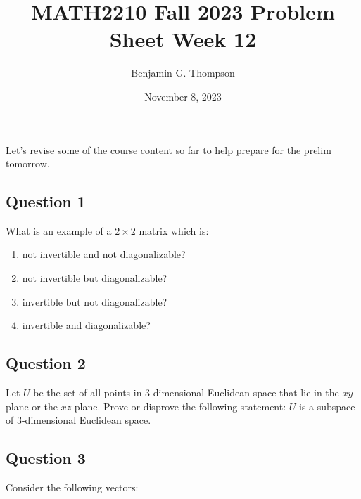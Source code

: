 \documentclass[12pt, a4paper]{article}
\title{MATH2210 Fall 2023 Problem Sheet Week 12}
\author{Benjamin G. Thompson}
\date{November 8, 2023}
\begin{document}
\noindent Let's revise some of the course content so far to help prepare for the prelim tomorrow.
\subsection*{Question 1}
What is an example of a $2 \times 2$ matrix which is:
\begin{enumerate}
\item not invertible and not diagonalizable?
\item not invertible but diagonalizable?
\item invertible but not diagonalizable?
\item invertible and diagonalizable?
\end{enumerate}

\subsection*{Question 2}
Let $U$ be the set of all points in 3-dimensional Euclidean space that lie in the $xy$ plane or the $xz$ plane. Prove or disprove the following statement: $U$ is a subspace of 3-dimensional Euclidean space.

\subsection*{Question 3}
Consider the following vectors:
\end{document}
